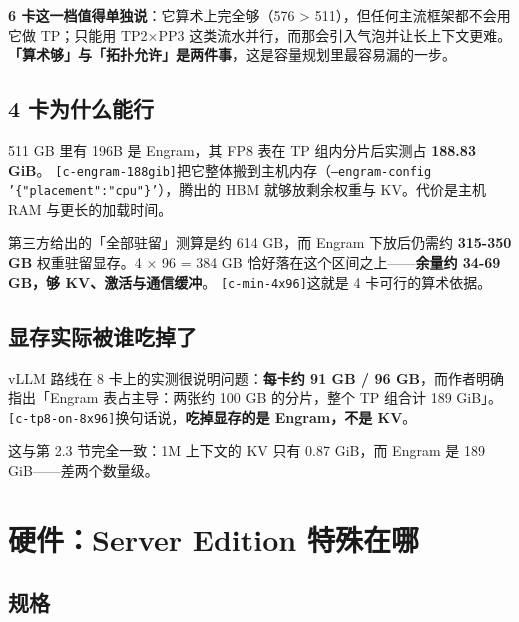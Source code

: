\textbf{6 卡这一档值得单独说}：它算术上完全够（576 > 511），但任何主流框架都不会用它做 TP；只能用 TP2×PP3 这类流水并行，而那会引入气泡并让长上下文更难。\textbf{「算术够」与「拓扑允许」是两件事}，这是容量规划里最容易漏的一步。


\subsection{4 卡为什么能行}

511 GB 里有 196B 是 Engram，其 FP8 表在 TP 组内分片后实测占 \textbf{188.83 GiB}。 {\scriptsize\texttt{[c-\hspace{0pt}engram-\hspace{0pt}188gib]}}把它整体搬到主机内存（\texttt{--engram-config '\{"placement":"cpu"\}'}），腾出的 HBM 就够放剩余权重与 KV。代价是主机 RAM 与更长的加载时间。


第三方给出的「全部驻留」测算是约 614 GB，而 Engram 下放后仍需约 \textbf{315-\hspace{0pt}350 GB} 权重驻留显存。4 × 96 = 384 GB 恰好落在这个区间之上——\textbf{余量约 34-\hspace{0pt}69 GB，够 KV、激活与通信缓冲}。 {\scriptsize\texttt{[c-\hspace{0pt}min-\hspace{0pt}4x96]}}这就是 4 卡可行的算术依据。


\subsection{显存实际被谁吃掉了}

vLLM 路线在 8 卡上的实测很说明问题：\textbf{每卡约 91 GB / 96 GB}，而作者明确指出「Engram 表占主导：两张约 100 GB 的分片，整个 TP 组合计 189 GiB」。 {\scriptsize\texttt{[c-\hspace{0pt}tp8-\hspace{0pt}on-\hspace{0pt}8x96]}}换句话说，\textbf{吃掉显存的是 Engram，不是 KV}。


这与第 2.3 节完全一致：1M 上下文的 KV 只有 0.87 GiB，而 Engram 是 189 GiB——差两个数量级。



\section{硬件：Server Edition 特殊在哪}

\subsection{规格}


